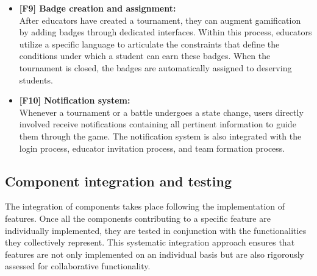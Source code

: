 \begin{itemize}
    \item \textbf{[F9] Badge creation and assignment:} \\
    After educators have created a tournament, they can augment gamification by adding badges through dedicated interfaces. Within this process, educators utilize a specific language to articulate the constraints that define the conditions under which a student can earn these badges. When the tournament is closed, the badges are automatically assigned to deserving students. 
    
    \item \textbf{[F10] Notification system:} \\
    Whenever a tournament or a battle undergoes a state change, users directly involved receive notifications containing all pertinent information to guide them through the game. The notification system is also integrated with the login process, educator invitation process, and team formation process.
    
\end{itemize}

\subsection{Component integration and testing}

The integration of components takes place following the implementation of features. Once all the components contributing to a specific feature are individually implemented, they are tested in conjunction with the functionalities they collectively represent. This systematic integration approach ensures that features are not only implemented on an individual basis but are also rigorously assessed for collaborative functionality.

